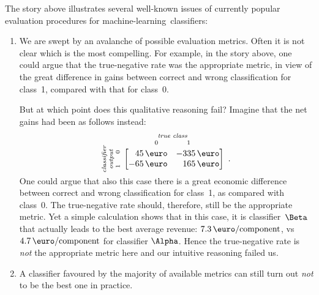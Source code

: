 \documentclass[\ifafour a4paper,12pt,\else a5paper,10pt,\fi%
onecolumn,oneside,article,%
british%
]{memoir}
\theoremstyle{remark}
\theoremstyle{innote}
\renewcommand*{\|}[1][]{\nonscript\:#1\vert\nonscript\:\mathopen{}}
\newcommand*{\ml}{machine-learning}
\begin{document}
The story above illustrates several well-known issues of currently popular evaluation procedures for \ml\ classifiers:
\begin{enumerate}%
\item We are swept by an avalanche of possible evaluation metrics. Often it is not clear which is the most compelling. For example, in the story above, one could argue that the true-negative rate was the appropriate metric, in view of the great difference in gains between correct and wrong classification for class~1, compared with that for class~0.

  But at which point does this qualitative reasoning fail? Imagine that the net gains had been as follows instead:
\begin{equation}
  \label{eq:utility_example_2}
  \rotatebox[origin=c]{90}{
    \clap{\textit{\parbox{5em}{\centering\scriptsize classifier\\output\\$1\hspace{1.5em}0$}}
    }}\ 
    \overbracket[0pt]{
      \begin{bmatrix*}[r]
        45\,\text{\texteuro} & -335\,\text{\texteuro}  \\
        -65\,\text{\texteuro} & 165\,\text{\texteuro}
      \end{bmatrix*}}^{
      \clap{\textit{\parbox{6em}{\centering\scriptsize true class\\$0\hspace{4em}1$}}
    }} \ .
\end{equation}
One could argue that also this case there is a great economic difference between correct and wrong classification for class~1, as compared with class~0. The true-negative rate should, therefore, still be the appropriate metric. Yet a simple calculation shows that in this case, it is classifier~$\Beta$ that actually leads to the best average revenue: $7.3\,\text{\texteuro/component}$, vs $4.7\,\text{\texteuro/component}$ for classifier $\Alpha$. Hence the true-negative rate is \emph{not} the appropriate metric here and our intuitive reasoning failed us.


\item A classifier favoured by the majority of available metrics can still turn out \emph{not} to be the best one in practice.


\end{enumerate}
\end{document}
